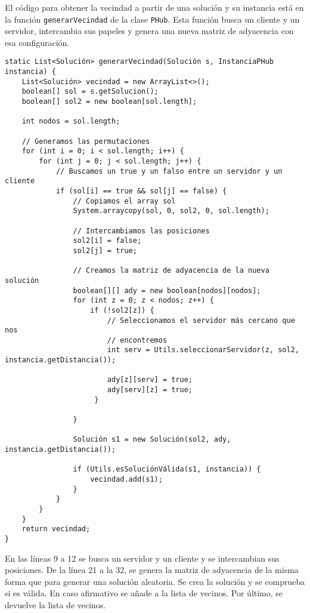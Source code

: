 \documentclass[12pt,a4paper,twoside,openright,titlepage,final]{article}
\begin{document}
El código para obtener la vecindad a partir de una solución y su instancia está en la función \texttt{generarVecindad} de la clase \texttt{PHub}. Esta función busca un cliente y un servidor, intercambia sus papeles y genera una nueva matriz de adyacencia con esa configuración.

\begin{verbatim}
static List<Solución> generarVecindad(Solución s, InstanciaPHub instancia) {
    List<Solución> vecindad = new ArrayList<>();
    boolean[] sol = s.getSolucion();
    boolean[] sol2 = new boolean[sol.length];

    int nodos = sol.length;

    // Generamos las permutaciones
    for (int i = 0; i < sol.length; i++) {
        for (int j = 0; j < sol.length; j++) {
            // Buscamos un true y un falso entre un servidor y un cliente
            if (sol[i] == true && sol[j] == false) {
                // Copiamos el array sol
                System.arraycopy(sol, 0, sol2, 0, sol.length);

                // Intercambiamos las posiciones
                sol2[i] = false;
                sol2[j] = true;

                // Creamos la matriz de adyacencia de la nueva solución
                boolean[][] ady = new boolean[nodos][nodos];
                for (int z = 0; z < nodos; z++) {
                    if (!sol2[z]) {
                        // Seleccionamos el servidor más cercano que nos
                        // encontremos
                        int serv = Utils.seleccionarServidor(z, sol2, instancia.getDistancia());

                        ady[z][serv] = true;
                        ady[serv][z] = true;
                     }

                }

                Solución s1 = new Solución(sol2, ady, instancia.getDistancia());

                if (Utils.esSoluciónVálida(s1, instancia)) {
                    vecindad.add(s1);
                }
            }
        }
    }
    return vecindad;
}
\end{verbatim}

En las líneas 9 a 12 se busca un servidor y un cliente y se intercambian sus posiciones. De la línea 21 a la 32, se genera la matriz de adyacencia de la misma forma que para generar una solución aleatoria. Se crea la solución y se comprueba si es válida. En caso afirmativo se añade a la lista de vecinos. Por último, se devuelve la lista de vecinos.
\end{document}
